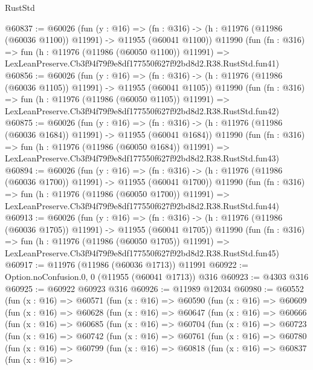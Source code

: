 \begin{lexlean}{RustStd}
\begin{coremodule}
@60837 := @60026
    (fun (y : @16) =>
    (fn : @316) -> (h : @11976 (@11986 (@60036 @1100)) @11991) -> @11955 (@60041 @1100))
    @11990
    (fun (fn : @316) =>
    fun (h : @11976 (@11986 (@60050 @1100)) @11991) =>
    LexLeanPreserve.Cb3f94f79f9e8df177550f627f92bd8d2.R38.RustStd.fun41)
@60856 := @60026
    (fun (y : @16) =>
    (fn : @316) -> (h : @11976 (@11986 (@60036 @1105)) @11991) -> @11955 (@60041 @1105))
    @11990
    (fun (fn : @316) =>
    fun (h : @11976 (@11986 (@60050 @1105)) @11991) =>
    LexLeanPreserve.Cb3f94f79f9e8df177550f627f92bd8d2.R38.RustStd.fun42)
@60875 := @60026
    (fun (y : @16) =>
    (fn : @316) -> (h : @11976 (@11986 (@60036 @1684)) @11991) -> @11955 (@60041 @1684))
    @11990
    (fun (fn : @316) =>
    fun (h : @11976 (@11986 (@60050 @1684)) @11991) =>
    LexLeanPreserve.Cb3f94f79f9e8df177550f627f92bd8d2.R38.RustStd.fun43)
@60894 := @60026
    (fun (y : @16) =>
    (fn : @316) -> (h : @11976 (@11986 (@60036 @1700)) @11991) -> @11955 (@60041 @1700))
    @11990
    (fun (fn : @316) =>
    fun (h : @11976 (@11986 (@60050 @1700)) @11991) =>
    LexLeanPreserve.Cb3f94f79f9e8df177550f627f92bd8d2.R38.RustStd.fun44)
@60913 := @60026
    (fun (y : @16) =>
    (fn : @316) -> (h : @11976 (@11986 (@60036 @1705)) @11991) -> @11955 (@60041 @1705))
    @11990
    (fun (fn : @316) =>
    fun (h : @11976 (@11986 (@60050 @1705)) @11991) =>
    LexLeanPreserve.Cb3f94f79f9e8df177550f627f92bd8d2.R38.RustStd.fun45)
@60917 := @11976 (@11986 (@60036 @1713)) @11991
@60922 := Option.noConfusion.{0, 0} (@11955 (@60041 @1713)) @316
@60923 := @4303 @316
@60925 := @60922 @60923 @316
@60926 := @11989 @12034
@60980 := @60552
    (fun (x : @16) =>
    @60571
      (fun (x : @16) =>
      @60590
        (fun (x : @16) =>
        @60609
          (fun (x : @16) =>
          @60628
            (fun (x : @16) =>
            @60647
              (fun (x : @16) =>
              @60666
                (fun (x : @16) =>
                @60685
                  (fun (x : @16) =>
                  @60704
                    (fun (x : @16) =>
                    @60723
                      (fun (x : @16) =>
                      @60742
                        (fun (x : @16) =>
                        @60761
                          (fun (x : @16) =>
                          @60780
                            (fun (x : @16) =>
                            @60799
                              (fun (x : @16) =>
                              @60818
                                (fun (x : @16) =>
                                @60837
                                  (fun (x : @16) =>

\end{coremodule}
\end{lexlean}
